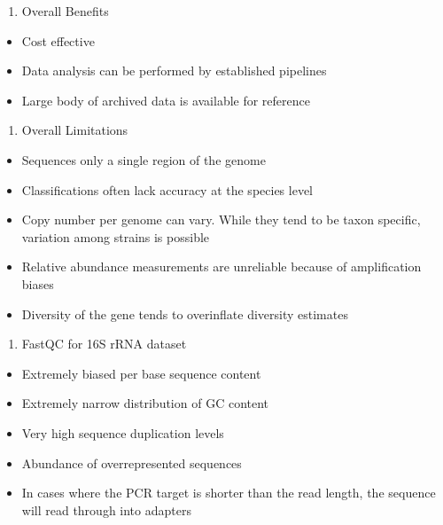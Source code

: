 \documentclass[
]{book}
\providecommand{\tightlist}{%
  \setlength{\itemsep}{0pt}\setlength{\parskip}{0pt}}
\begin{document}
\begin{enumerate}
\def\labelenumi{\arabic{enumi}.}
\tightlist
\item
  Overall Benefits
\end{enumerate}

\begin{itemize}
\tightlist
\item
  Cost effective
\item
  Data analysis can be performed by established pipelines
\item
  Large body of archived data is available for reference
\end{itemize}

\begin{enumerate}
\def\labelenumi{\arabic{enumi}.}
\setcounter{enumi}{1}
\tightlist
\item
  Overall Limitations
\end{enumerate}

\begin{itemize}
\tightlist
\item
  Sequences only a single region of the genome
\item
  Classifications often lack accuracy at the
  species level
\item
  Copy number per genome can vary. While they
  tend to be taxon specific, variation among
  strains is possible
\item
  Relative abundance measurements are
  unreliable because of amplification biases
\item
  Diversity of the gene tends to overinflate
  diversity estimates
\end{itemize}

\begin{enumerate}
\def\labelenumi{\arabic{enumi}.}
\setcounter{enumi}{2}
\tightlist
\item
  FastQC for 16S rRNA dataset
\end{enumerate}

\begin{itemize}
\tightlist
\item
  Extremely biased per base sequence content
\item
  Extremely narrow distribution of GC content
\item
  Very high sequence duplication levels
\item
  Abundance of overrepresented sequences
\item
  In cases where the PCR target is shorter than the read length, the sequence will read through into adapters
\end{itemize}
\end{document}
